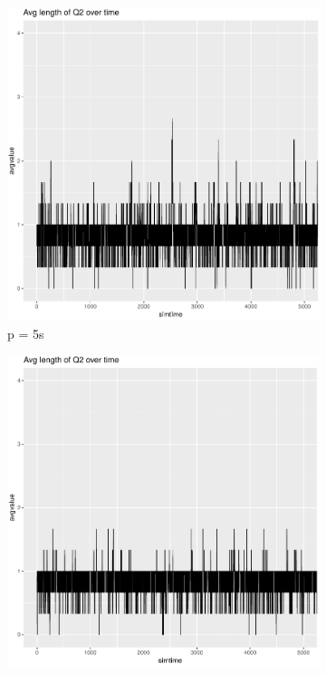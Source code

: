 \documentclass[a4paper,11pt]{article}
\begin{document}
\begin{figure}[h!]
\begin{subfigure}{.5\textwidth}
  \centering
  \includegraphics[width=.9\linewidth]{images/chart-q2avglength-5.png}
  \caption{p = 5s}
  \label{fig:sfig1}
\end{subfigure}%
\begin{subfigure}{.5\textwidth}
  \centering
  \includegraphics[width=.9\linewidth]{images/chart-q2avglength-75.png}

\end{subfigure}
\end{figure}
\end{document}
